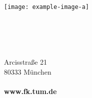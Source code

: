 \documentclass[parskip=on, twoside]{scrartcl}
\begin{document}
\texttt{[image: example-image-a]}


\pagestyle{TUM.titlepage}
\strut\vfill
\theUniversityName\\
\theDepartmentName\\
\theChairName\\
\\
Arcisstraße 21\\
80333 München\\
\\
\textbf{www.fk.tum.de}
\end{document}
